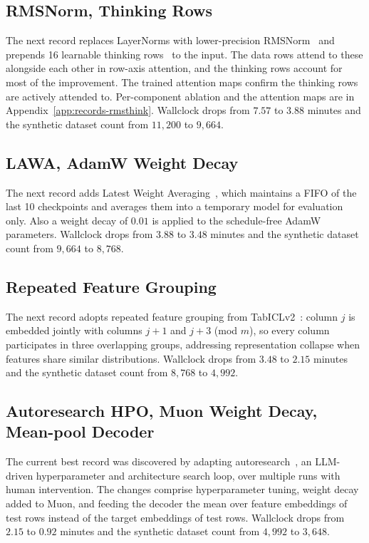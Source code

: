 \documentclass{article}
\theoremstyle{plain}
\theoremstyle{definition}
\theoremstyle{remark}
\begin{document}
\subsection{RMSNorm, Thinking Rows}
The next record replaces LayerNorms with lower-precision RMSNorm~\citep{zhang2019rmsnorm} and prepends 16 learnable thinking rows~\citep{grinsztajn2026tabpfn25advancingstateart} to the input.
The data rows attend to these alongside each other in row-axis attention, and the thinking rows account for most of the improvement.
The trained attention maps confirm the thinking rows are actively attended to.
Per-component ablation and the attention maps are in Appendix~\ref{app:records-rmsthink}.
Wallclock drops from $7.57$ to $3.88$ minutes and the synthetic dataset count from $11{,}200$ to $9{,}664$.

\subsection{LAWA, AdamW Weight Decay}
The next record adds Latest Weight Averaging~\citep{kaddour2022lawa,sanyal2024early}, which maintains a FIFO of the last 10 checkpoints and averages them into a temporary model for evaluation only.
Also a weight decay of $0.01$ is applied to the schedule-free AdamW parameters.
Wallclock drops from $3.88$ to $3.48$ minutes and the synthetic dataset count from $9{,}664$ to $8{,}768$.

\subsection{Repeated Feature Grouping}
The next record adopts repeated feature grouping from TabICLv2~\citep{qu2026tabiclv2}: column $j$ is embedded jointly with columns $j{+}1$ and $j{+}3$ (mod $m$), so every column participates in three overlapping groups, addressing representation collapse when features share similar distributions.
Wallclock drops from $3.48$ to $2.15$ minutes and the synthetic dataset count from $8{,}768$ to $4{,}992$.

\subsection{Autoresearch HPO, Muon Weight Decay, Mean-pool Decoder}
The current best record was discovered by adapting autoresearch~\citep{karpathy2026autoresearch}, an LLM-driven hyperparameter and architecture search loop, over multiple runs with human intervention. The changes comprise hyperparameter tuning, weight decay added to Muon, and feeding the decoder the mean over feature embeddings of test rows instead of the target embeddings of test rows.
Wallclock drops from $2.15$ to $0.92$ minutes and the synthetic dataset count from $4{,}992$ to $3{,}648$.
\end{document}
